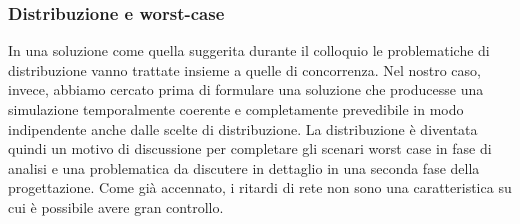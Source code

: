 \subsubsection{Distribuzione e worst-case}
In una soluzione come quella suggerita durante il colloquio le problematiche di distribuzione vanno trattate insieme a quelle di concorrenza.
Nel nostro caso, invece, abbiamo cercato prima di formulare una soluzione che producesse una simulazione temporalmente coerente e completamente prevedibile in modo indipendente anche dalle scelte di distribuzione. La distribuzione è diventata quindi un motivo di discussione per completare gli scenari worst case in fase di analisi e una problematica da discutere in dettaglio in una seconda fase della progettazione. Come già accennato, i ritardi di rete non sono una caratteristica su cui è possibile avere gran controllo.
